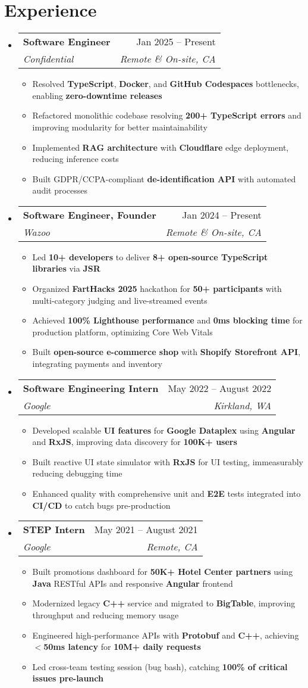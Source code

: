\documentclass[letterpaper,11pt]{article}
\makeatletter
\newcommand{\resumeItem}[1]{
  \item\small{
    {#1 \vspace{-2pt}}
  }
}
\newcommand{\resumeSubheading}[4]{
  \vspace{-2pt}\item
    \begin{tabular*}{0.97\textwidth}[t]{l@{\extracolsep{\fill}}r}
      \textbf{#1} & #2 \\
      \textit{\small#3} & \textit{\small #4} \\
    \end{tabular*}\vspace{-7pt}
}
\newcommand{\resumeSubHeadingListStart}{\begin{itemize}[leftmargin=0.15in, label={}]}
\newcommand{\resumeSubHeadingListEnd}{\end{itemize}}
\newcommand{\resumeItemListStart}{\begin{itemize}}
\newcommand{\resumeItemListEnd}{\end{itemize}\vspace{-5pt}}
\makeatother
\begin{document}
\section{Experience}
\resumeSubHeadingListStart
  \resumeSubheading
    {Software Engineer}{Jan 2025 -- Present}
    {Confidential}{Remote \& On-site, CA}
    \resumeItemListStart
      \resumeItem{Resolved \textbf{TypeScript}, \textbf{Docker}, and \textbf{GitHub Codespaces} bottlenecks, enabling \textbf{zero-downtime releases}}
      \resumeItem{Refactored monolithic codebase resolving \textbf{200+ TypeScript errors} and improving modularity for better maintainability}
      \resumeItem{Implemented \textbf{RAG architecture} with \textbf{Cloudflare} edge deployment, reducing inference costs}
      \resumeItem{Built GDPR/CCPA-compliant \textbf{de-identification API} with automated audit processes}
    \resumeItemListEnd
  
  \resumeSubheading
    {Software Engineer, Founder}{Jan 2024 -- Present}
    {Wazoo}{Remote \& On-site, CA}
    \resumeItemListStart
      \resumeItem{Led \textbf{10+ developers} to deliver \textbf{8+ open-source TypeScript libraries} via \textbf{JSR}}
      \resumeItem{Organized \textbf{FartHacks 2025} hackathon for \textbf{50+ participants} with multi-category judging and live-streamed events}
      \resumeItem{Achieved \textbf{100\% Lighthouse performance} and \textbf{0ms blocking time} for production platform, optimizing Core Web Vitals}
      \resumeItem{Built \textbf{open-source e-commerce shop} with \textbf{Shopify Storefront API}, integrating payments and inventory}
    \resumeItemListEnd

  \resumeSubheading
    {Software Engineering Intern}{May 2022 -- August 2022}
    {Google}{Kirkland, WA}
    \resumeItemListStart
      \resumeItem{Developed scalable \textbf{UI features} for \textbf{Google Dataplex} using \textbf{Angular} and \textbf{RxJS}, improving data discovery for \textbf{100K+ users}}
      \resumeItem{Built reactive UI state simulator with \textbf{RxJS} for UI testing, immeasurably reducing debugging time}
      \resumeItem{Enhanced quality with comprehensive unit and \textbf{E2E} tests integrated into \textbf{CI/CD} to catch bugs pre-production}
    \resumeItemListEnd

  \resumeSubheading
    {STEP Intern}{May 2021 -- August 2021}
    {Google}{Remote, CA}
    \resumeItemListStart
      \resumeItem{Built promotions dashboard for \textbf{50K+ Hotel Center partners} using \textbf{Java} RESTful APIs and responsive \textbf{Angular} frontend}
      \resumeItem{Modernized legacy \textbf{C++} service and migrated to \textbf{BigTable}, improving throughput and reducing memory usage}
      \resumeItem{Engineered high-performance APIs with \textbf{Protobuf} and \textbf{C++}, achieving \textbf{$<$50ms latency} for \textbf{10M+ daily requests}}
      \resumeItem{Led cross-team testing session (bug bash), catching \textbf{100\% of critical issues pre-launch}}
    \resumeItemListEnd
\resumeSubHeadingListEnd
\end{document}
